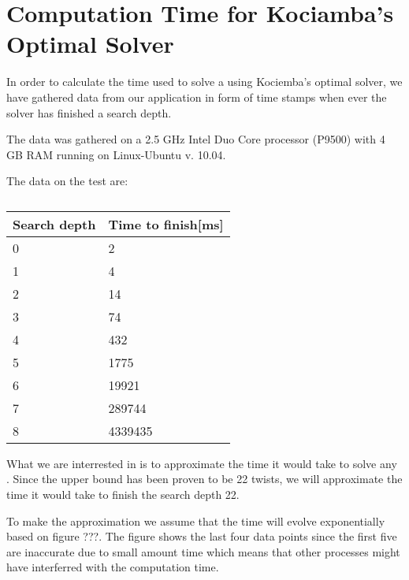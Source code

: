 \chapter{Computation Time for Kociamba's Optimal Solver}
In order to calculate the time used to solve a \rubik{} using Kociemba's optimal solver, we have gathered data from our application in form of time stamps when ever the solver has finished a search depth.

The data was gathered on a 2.5 GHz Intel Duo Core processor (P9500) with 4 GB RAM running on Linux-Ubuntu v. 10.04.

\begin{table}[hb]
\centering
The data on the test are:
	\begin{tabular}{|l|l|}
	\hline
	Search depth&Time to finish[ms]\\
	\hline
	0&2\\
	\hline
	1&4\\
	\hline
	2&14\\
	\hline
	3&74\\
	\hline
	4&432\\
	\hline
	5&1775\\
	\hline
	6&19921\\
	\hline
	7&289744\\
	\hline
	8&4339435\\
	\hline
	\end{tabular}
\caption{}
	\label{tab:timeData}
\end{table}

What we are interrested in is to approximate the time it would take to solve any \rubik{}.
Since the upper bound has been proven to be 22 twists, we will approximate the time it would take to finish the search depth 22.

To make the approximation we assume that the time will evolve exponentially based on figure ???. The figure shows the last four data points since the first five are inaccurate due to small amount time which means that other processes might have interferred with the computation time.